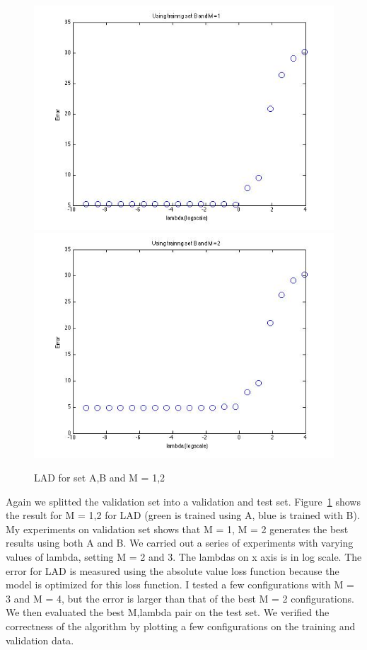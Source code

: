 \begin{figure}[!htb]
                                                                                 \includegraphics[width=\linewidth]{figures/p4_LAD_regressB_m=1}
\endminipage\hfill
{}
  \includegraphics[width=\linewidth]{figures/p4_LAD_regressB_m=2}
\endminipage\hfill
\caption{LAD for set A,B and M = 1,2}\label{p4_LAD}
\end{figure}

Again we splitted the validation set into a validation and test set. Figure~\ref{p4_LAD} shows the result for M = 1,2 for LAD (green is trained using A, blue is trained with B). My experiments on validation set shows that M = 1, M = 2 generates the best results using both A and B. We carried out a series of experiments with varying values of lambda, setting M = 2 and 3. The lambdas on x axis is in log scale. The error for LAD is measured using the absolute value loss function because the model is optimized for this loss function. I tested a few configurations with M = 3 and M = 4, but the error is larger than that of the best M = 2 configurations. We then evaluated the best M,lambda pair on the test set. We verified the correctness of the algorithm by plotting a few configurations on the training and validation data. 

